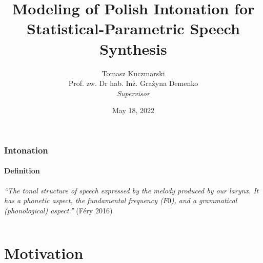 \documentclass[a4paper,9pt]{beamer}
\theoremstyle{mytheoremstyle}
\begin{document}
\title[Modeling of Polish Intonation for SPSS]{Modeling of Polish Intonation for Statistical-Parametric Speech Synthesis}
\author[Tomasz Kuczmarski]{Tomasz Kuczmarski\\
\vspace{0.5cm}
\small{Prof. zw. Dr hab. In\.z. Gra\.zyna Demenko}\\
\textit{\tiny{Supervisor}}}

\date{\tiny{May 18, 2022}}

%
\begin{frame}
\titlepage
\end{frame}




\begin{frame}
\frametitle{Intonation}
\framesubtitle{Definition}
\vspace{2cm}
\textit<1-2>{``The tonal structure of speech expressed by the melody produced by our larynx. It has a phonetic aspect, the fundamental frequency ($F0$), and a grammatical (phonological) aspect.''} (F\'ery 2016)
\begin{columns}
\vspace{0.5cm}
\end{columns}
\end{frame}

\section{Motivation}
\end{document}
